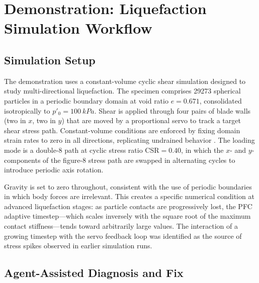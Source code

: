 \section{Demonstration: Liquefaction Simulation Workflow}
\label{sec:demonstration}

\subsection{Simulation Setup}
\label{sec:demo:setup}


The demonstration uses a constant-volume cyclic shear simulation designed to study multi-directional liquefaction. The specimen comprises \num{29273} spherical particles in a periodic boundary domain at void ratio $e = 0.671$, consolidated isotropically to $p'_0 = \SI{100}{kPa}$. Shear is applied through four pairs of blade walls (two in $x$, two in $y$) that are moved by a proportional servo to track a target shear stress path. Constant-volume conditions are enforced by fixing domain strain rates to zero in all directions, replicating undrained behavior \citep{Thornton2000}. The loading mode is a double-8 path at cyclic stress ratio CSR$= 0.40$, in which the $x$- and $y$-components of the figure-8 stress path are swapped in alternating cycles to introduce periodic axis rotation.

Gravity is set to zero throughout, consistent with the use of periodic boundaries in which body forces are irrelevant. This creates a specific numerical condition at advanced liquefaction stages: as particle contacts are progressively lost, the PFC adaptive timestep---which scales inversely with the square root of the maximum contact stiffness---tends toward arbitrarily large values. The interaction of a growing timestep with the servo feedback loop was identified as the source of stress spikes observed in earlier simulation runs.

\subsection{Agent-Assisted Diagnosis and Fix}
\label{sec:demo:diagnosis}


